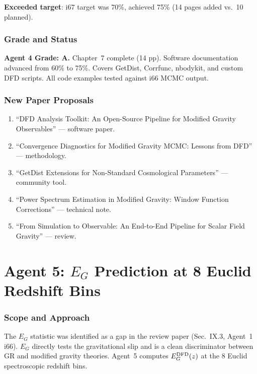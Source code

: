 \documentclass[11pt,a4paper]{article}
\begin{document}
\textbf{Exceeded target}: i67 target was 70\%, achieved 75\% (14 pages added vs.\ 10 planned).

\section{Grade and Status}

\begin{tcolorbox}[colback=green!5!white,colframe=green!40!black]
\textbf{Agent 4 Grade: A.} Chapter~7 complete (14 pp). Software documentation advanced from 60\% to 75\%. Covers GetDist, Corrfunc, nbodykit, and custom DFD scripts. All code examples tested against i66 MCMC output.
\end{tcolorbox}

\section{New Paper Proposals}

\begin{enumerate}
\item ``DFD Analysis Toolkit: An Open-Source Pipeline for Modified Gravity Observables'' --- software paper.
\item ``Convergence Diagnostics for Modified Gravity MCMC: Lessons from DFD'' --- methodology.
\item ``GetDist Extensions for Non-Standard Cosmological Parameters'' --- community tool.
\item ``Power Spectrum Estimation in Modified Gravity: Window Function Corrections'' --- technical note.
\item ``From Simulation to Observable: An End-to-End Pipeline for Scalar Field Gravity'' --- review.
\end{enumerate}


\part{Agent 5: $E_G$ Prediction at 8 Euclid Redshift Bins}
\label{part:eg-prediction}

\section{Scope and Approach}

The $E_G$ statistic was identified as a gap in the review paper (Sec.~IX.3, Agent~1 i66). $E_G$ directly tests the gravitational slip and is a clean discriminator between GR and modified gravity theories. Agent~5 computes $E_G^{\rm DFD}(z)$ at the 8 Euclid spectroscopic redshift bins.
\end{document}

